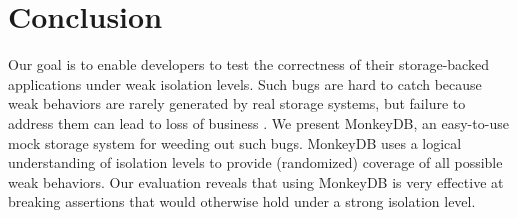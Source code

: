 
\section{Conclusion}
\label{sec:app:conc}

Our goal is to enable developers to test the correctness of their storage-backed applications under 
weak isolation levels. Such bugs are hard to catch because weak behaviors are
rarely generated by real storage systems, but failure to address them can lead
to loss of business \cite{DBLP:conf/sigmod/WarszawskiB17}. We present MonkeyDB, an easy-to-use mock storage system
for weeding out such bugs. MonkeyDB uses a logical understanding of isolation
levels to provide (randomized) coverage of all possible weak behaviors. Our evaluation reveals that
using MonkeyDB is very effective at breaking assertions that would otherwise
hold under a strong isolation level.

